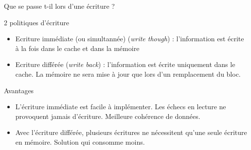 %
\begin{Frame}{Que se passe t-il lors d'une écriture ?}


  \begin{block}{2 politiques d'écriture}
    \begin{center}
      \begin{itemize}
      \item Ecriture immédiate (ou simultannée) (\emph{write though}) :
        l'information est écrite à la fois dans le cache et dans la
        mémoire
      \item Ecriture différée (\emph{write back}) : l'information est
        écrite uniquement dans le cache. La mémoire ne sera mise à jour
        que lors d'un remplacement du bloc.
      \end{itemize}
    \end{center}
  \end{block}   

  \begin{block}{Avantages}
    \begin{center}
 	\begin{itemize}
    \item L'écriture immédiate est facile à implémenter. Les échecs en
      lecture ne provoquent jamais d'écriture. Meilleure cohérence de
      données.
        \item Avec l'écriture différée, plusieurs écritures ne
          nécessitent qu'une seule écriture en mémoire. Solution qui
          consomme moins.
        \end{itemize}
    \end{center}
  \end{block}   


\end{Frame}


